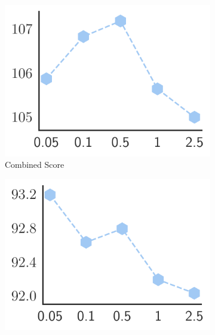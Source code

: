 \begin{figure}[tb]
     \vspace{-2mm}
     \centering
     \begin{subfigure}[b]{0.24\textwidth}
         \centering
         \includegraphics[width=\textwidth]{./Tex/fig/comb_alpha_line.pdf}
         \captionsetup{font=small}
         \vspace{-6mm}
         \caption{\footnotesize{Combined Score}}
         \label{fig:vary_alpha_comb}
     \end{subfigure}
     \hfill
     \begin{subfigure}[b]{0.24\textwidth}
         \centering
         \includegraphics[width=\textwidth]{./Tex/fig/inform_alpha_line.pdf}
         \captionsetup{font=small}

\end{subfigure}
\end{figure}
